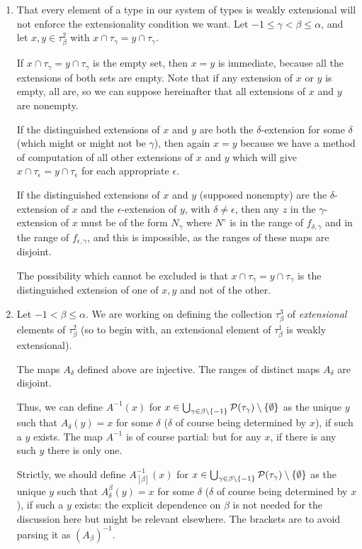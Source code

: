 \documentclass[12pt]{article}
\begin{document}
\begin{enumerate}
\item  That every element of a type in our system of types is weakly extensional will not enforce the extensionality condition we want.  Let $-1 \leq \gamma < \beta \leq \alpha$, and let
$x,y \in \tau^2_\beta$ with $x \cap \tau_\gamma = y \cap \tau_\gamma$.   

If $x \cap \tau_\gamma = y \cap \tau_\gamma$ is the empty set, then $x=y$ is immediate, because all the extensions of both sets are empty.  Note that if any extension
of $x$ or $y$ is empty, all are, so we can suppose hereinafter that all extensions of $x$ and $y$ are nonempty.

If the distinguished extensions of $x$ and $y$ are both the $\delta$-extension for some $\delta$ (which might or might not be $\gamma$), then again $x=y$ because we have a method of computation of all other extensions of $x$ and $y$ which will give $x \cap \tau_\epsilon = y \cap \tau_\epsilon$ for each appropriate $\epsilon$. 

If the distinguished extensions of $x$ and $y$ (supposed nonempty) are the $\delta$-extension of $x$ and the $\epsilon$-extension of $y$, with $\delta \neq \epsilon$, then any $z$ in the $\gamma$-extension of $x$ must be of the form $N_\gamma$ where $N^\circ$ is in the range of $f_{\delta,\gamma}$ and in the range of $f_{\epsilon,\gamma}$, and this is impossible, as the ranges of these maps are disjoint.

The possibility which cannot be excluded is that $x \cap \tau_\gamma = y \cap \tau_\gamma$ is the distinguished extension of one of $x,y$ and not of the other.

\item  Let $-1 < \beta \leq \alpha$.  We are working on defining the collection $\tau_\beta^3$ of {\em extensional\/} elements of $\tau^2_\beta$ (so to begin with,
an extensional element of $\tau^1_\beta$ is weakly extensional).

The maps $A_\delta$ defined above are injective.  The ranges of distinct maps $A_\delta$ are disjoint.  

Thus, we can define $A^{-1}(x)$ for $x \in \bigcup_{\gamma \in \beta\setminus \{-1\}} {\cal P} (\tau_\gamma) \setminus \{\emptyset\}$ as the unique $y$ such that $A_{\delta}(y)=x$ for some $\delta$ ($\delta$ of course being determined by $x$), if such a $y$ exists.  The map $A^{-1}$ is of course partial:  but for any $x$, if there is any such $y$ there is only one.

Strictly, we should define $A_{[\beta]}^{-1}(x)$ for $x \in \bigcup_{\gamma \in \beta\setminus \{-1\}} {\cal P} (\tau_\gamma) \setminus \{\emptyset\}$ as the unique $y$ such that $A^\beta_{\delta}(y)=x$ for some $\delta$ ($\delta$ of course being determined by $x$), if such a $y$ exists:  the explicit dependence on $\beta$ is not needed for the discussion here but might be relevant elsewhere.   The brackets are to avoid parsing it as $(A_\beta)^{-1}$.


\end{enumerate}
\end{document}
